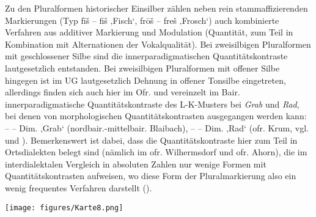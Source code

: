Zu den Pluralformen historischer Einsilber zählen neben rein stammaffizierenden Markierungen (Typ fīš -- fiš ‚Fisch‘, frōš -- freš ‚Frosch‘) auch kombinierte Verfahren aus additiver Markierung und Modulation (Quantität, zum Teil in Kombination mit Alternationen der Vokalqualität). Bei zweisilbigen Pluralformen mit geschlossener Silbe sind die innerparadigmatischen Quantitätskontraste lautgesetzlich entstanden. Bei zweisilbigen Pluralformen mit offener Silbe hingegen ist im UG lautgesetzlich Dehnung in offener Tonsilbe eingetreten, allerdings finden sich auch hier im Ofr. und vereinzelt im Bair. innerparadigmatische Quantitätskontraste des L-K-Musters bei \textit{Grab} und \textit{Rad}, bei denen von morphologischen Quantitätskontrasten ausgegangen werden kann:  --  -- Dim.  ‚Grab‘ (nordbair.-mittelbair. Blaibach),  --  -- Dim.  ‚Rad‘ (ofr. Krum, vgl. \citealt[165]{Rowley1997} und \citealt[Karte 23]{SMF7}). Bemerkenswert ist dabei, dass die Quantitätskontraste hier zum Teil in Ortsdialekten belegt sind (nämlich im ofr. Wilhermsdorf und ofr. Ahorn), die im interdialektalen Vergleich in absoluten Zahlen nur wenige Formen mit Quantitätskontrasten aufweisen, wo diese Form der Pluralmarkierung also ein wenig frequentes Verfahren darstellt (\citealt[110]{SMF7}).


\begin{map}
\texttt{[image: figures/Karte8.png]}
\caption{L-K-Quantitätswechsel bei historischen Einsilbern mit altem Kurzvokal ($n=706$)\protect\footnote{In den BSA-Erhebungen wurde alter Kurzvokal vor Nasal in historischen Einsilbern nur in \textit{Sohn} (keine Belege für innerparadigmatische Quantitätskontraste) und \textit{Mann} (Kürzung in den ofr. und nordbair. Tiefenbohrungspunkten) abgefragt, weshalb diese Umgebung in der Kombinationskarte nicht berücksichtigt wurde. Ebenso nicht berücksichtigt wurde alter Kurzvokal+/l/, das nur in \textit{Stall} abgefragt wurde und im Ofr. sowie vereinzelt im Bair. belegt ist.}}
\label{map:8}
\end{map}

